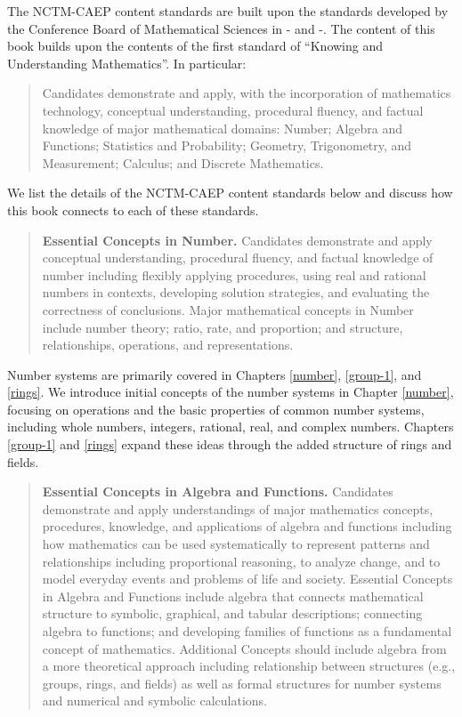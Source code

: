 \documentclass[
]{book}
\theoremstyle{definition}
\theoremstyle{definition}
\theoremstyle{definition}
\theoremstyle{definition}
\theoremstyle{remark}
\begin{document}
The NCTM-CAEP content standards are built upon the standards developed by the Conference Board of Mathematical Sciences in -\citet{MET1} and -\citet{MET2}. The content of this book builds upon the contents of the first standard of ``Knowing and Understanding Mathematics''. In particular:

\begin{quote}
Candidates demonstrate and apply, with the incorporation of mathematics technology, conceptual understanding, procedural fluency, and factual knowledge of major mathematical domains: Number; Algebra and Functions; Statistics and Probability; Geometry, Trigonometry, and Measurement; Calculus; and Discrete Mathematics.
\end{quote}

We list the details of the NCTM-CAEP content standards below and discuss how this book connects to each of these standards.

\begin{quote}
\textbf{Essential Concepts in Number.} Candidates demonstrate and apply conceptual understanding, procedural fluency, and factual knowledge of number including flexibly applying procedures, using real and rational numbers in contexts, developing solution strategies, and evaluating the correctness of conclusions. Major mathematical concepts in Number include number theory; ratio, rate, and proportion; and structure, relationships, operations, and representations.
\end{quote}

Number systems are primarily covered in Chapters \ref{number}, \ref{group-1}, and \ref{rings}. We introduce initial concepts of the number systems in Chapter \ref{number}, focusing on operations and the basic properties of common number systems, including whole numbers, integers, rational, real, and complex numbers. Chapters \ref{group-1} and \ref{rings} expand these ideas through the added structure of rings and fields.

\begin{quote}
\textbf{Essential Concepts in Algebra and Functions.} Candidates demonstrate and apply understandings of major mathematics concepts, procedures, knowledge, and applications of algebra and functions including how mathematics can be used systematically to represent patterns and relationships including proportional reasoning, to analyze change, and to model everyday events and problems of life and society. Essential Concepts in Algebra and Functions include algebra that connects mathematical structure to symbolic, graphical, and tabular descriptions; connecting algebra to functions; and developing families of functions as a fundamental concept of mathematics. Additional Concepts should include algebra from a more theoretical approach including relationship between structures (e.g., groups, rings, and fields) as well as formal structures for number systems and numerical and symbolic calculations.
\end{quote}
\end{document}
